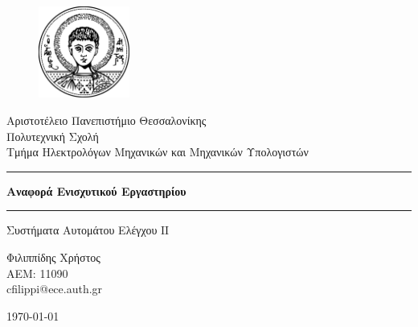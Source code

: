 \begin{titlepage}

\begin{figure}[H]
  \begin{center}
    \includegraphics[width=3cm]{Cover/Image/auth.pdf}
    \label{fig:cover_auth_logo}
  \end{center}
\end{figure}

\centering
\Large Αριστοτέλειο Πανεπιστήμιο Θεσσαλονίκης\\
\Large Πολυτεχνική Σχολή\\
\large Τμήμα Ηλεκτρολόγων Μηχανικών και Μηχανικών Υπολογιστών\\

\vspace{\fill}
\hrule 
\vspace{1cm}
\LARGE \textbf{Αναφορά Ενισχυτικού Εργαστηρίου} 
\vspace{1cm}
\hrule
\vspace{\fill}

\Large Συστήματα Αυτομάτου Ελέγχου ΙΙ

\vspace{\fill}

\Large Φιλιππίδης Χρήστος \\
\Large ΑΕΜ: 11090 \\
\Large cfilippi@ece.auth.gr

\vspace{\fill}

\e\today

\end{titlepage}

